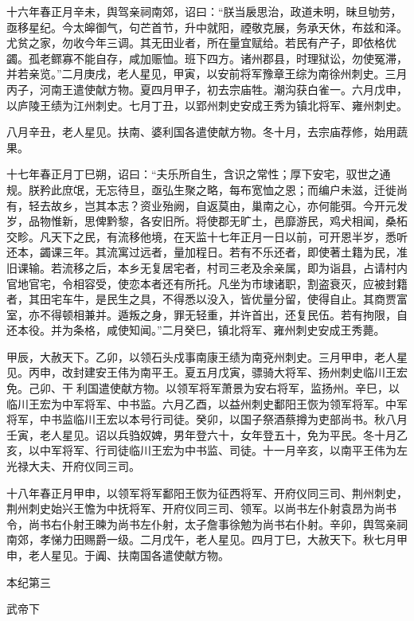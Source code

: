 \documentclass[12pt,UTF8]{ctexbook}
\begin{document}
十六年春正月辛未，舆驾亲祠南郊，诏曰：“朕当扆思治，政道未明，昧旦劬劳，亟移星纪。今太皞御气，句芒首节，升中就阳，禋敬克展，务承天休，布兹和泽。尤贫之家，勿收今年三调。其无田业者，所在量宜赋给。若民有产子，即依格优蠲。孤老鳏寡不能自存，咸加赈恤。班下四方。诸州郡县，时理狱讼，勿使冤滞，并若亲览。”二月庚戌，老人星见，甲寅，以安前将军豫章王综为南徐州刺史。三月丙子，河南王遣使献方物。夏四月甲子，初去宗庙牲。潮沟获白雀一。六月戊申，以庐陵王绩为江州刺史。七月丁丑，以郢州刺史安成王秀为镇北将军、雍州刺史。

八月辛丑，老人星见。扶南、婆利国各遣使献方物。冬十月，去宗庙荐修，始用蔬果。

十七年春正月丁巳朔，诏曰：“夫乐所自生，含识之常性；厚下安宅，驭世之通规。朕矜此庶氓，无忘待旦，亟弘生聚之略，每布宽恤之恩；而编户未滋，迁徙尚有，轻去故乡，岂其本志？资业殆阙，自返莫由，巢南之心，亦何能弭。今开元发岁，品物惟新，思俾黔黎，各安旧所。将使郡无旷土，邑靡游民，鸡犬相闻，桑柘交畛。凡天下之民，有流移他境，在天监十七年正月一日以前，可开恩半岁，悉听还本，蠲课三年。其流寓过远者，量加程日。若有不乐还者，即使著土籍为民，准旧课输。若流移之后，本乡无复居宅者，村司三老及余亲属，即为诣县，占请村内官地官宅，令相容受，使恋本者还有所托。凡坐为市埭诸职，割盗衰灭，应被封籍者，其田宅车牛，是民生之具，不得悉以没入，皆优量分留，使得自止。其商贾富室，亦不得顿相兼并。遁叛之身，罪无轻重，并许首出，还复民伍。若有拘限，自还本役。并为条格，咸使知闻。”二月癸巳，镇北将军、雍州刺史安成王秀薨。

甲辰，大赦天下。乙卯，以领石头戍事南康王绩为南兗州刺史。三月甲申，老人星见。丙申，改封建安王伟为南平王。夏五月戊寅，骠骑大将军、扬州刺史临川王宏免。己卯、干利国遣使献方物。以领军将军萧景为安右将军，监扬州。辛巳，以临川王宏为中军将军、中书监。六月乙酉，以益州刺史鄱阳王恢为领军将军。中军将军，中书监临川王宏以本号行司徒。癸卯，以国子祭酒蔡撙为吏部尚书。秋八月壬寅，老人星见。诏以兵驺奴婢，男年登六十，女年登五十，免为平民。冬十月乙亥，以中军将军、行司徒临川王宏为中书监、司徒。十一月辛亥，以南平王伟为左光禄大夫、开府仪同三司。

十八年春正月甲申，以领军将军鄱阳王恢为征西将军、开府仪同三司、荆州刺史，荆州刺史始兴王憺为中抚将军、开府仪同三司、领军。以尚书左仆射袁昂为尚书令，尚书右仆射王暕为尚书左仆射，太子詹事徐勉为尚书右仆射。辛卯，舆驾亲祠南郊，孝悌力田赐爵一级。二月戊午，老人星见。四月丁巳，大赦天下。秋七月甲申，老人星见。于阗、扶南国各遣使献方物。





本纪第三

武帝下
\end{document}
